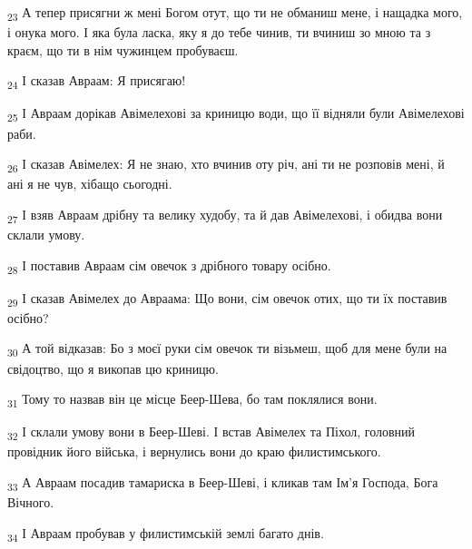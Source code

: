 \begin{tcolorbox}
\textsubscript{23} А тепер присягни ж мені Богом отут, що ти не обманиш мене, і нащадка мого, і онука мого. І яка була ласка, яку я до тебе чинив, ти вчиниш зо мною та з краєм, що ти в нім чужинцем пробуваєш.
\end{tcolorbox}
\begin{tcolorbox}
\textsubscript{24} І сказав Авраам: Я присягаю!
\end{tcolorbox}
\begin{tcolorbox}
\textsubscript{25} І Авраам дорікав Авімелехові за криницю води, що її відняли були Авімелехові раби.
\end{tcolorbox}
\begin{tcolorbox}
\textsubscript{26} І сказав Авімелех: Я не знаю, хто вчинив оту річ, ані ти не розповів мені, й ані я не чув, хібащо сьогодні.
\end{tcolorbox}
\begin{tcolorbox}
\textsubscript{27} І взяв Авраам дрібну та велику худобу, та й дав Авімелехові, і обидва вони склали умову.
\end{tcolorbox}
\begin{tcolorbox}
\textsubscript{28} І поставив Авраам сім овечок з дрібного товару осібно.
\end{tcolorbox}
\begin{tcolorbox}
\textsubscript{29} І сказав Авімелех до Авраама: Що вони, сім овечок отих, що ти їх поставив осібно?
\end{tcolorbox}
\begin{tcolorbox}
\textsubscript{30} А той відказав: Бо з моєї руки сім овечок ти візьмеш, щоб для мене були на свідоцтво, що я викопав цю криницю.
\end{tcolorbox}
\begin{tcolorbox}
\textsubscript{31} Тому то назвав він це місце Беер-Шева, бо там поклялися вони.
\end{tcolorbox}
\begin{tcolorbox}
\textsubscript{32} І склали умову вони в Беер-Шеві. І встав Авімелех та Піхол, головний провідник його війська, і вернулись вони до краю филистимського.
\end{tcolorbox}
\begin{tcolorbox}
\textsubscript{33} А Авраам посадив тамариска в Беер-Шеві, і кликав там Ім'я Господа, Бога Вічного.
\end{tcolorbox}
\begin{tcolorbox}
\textsubscript{34} І Авраам пробував у филистимській землі багато днів.
\end{tcolorbox}
